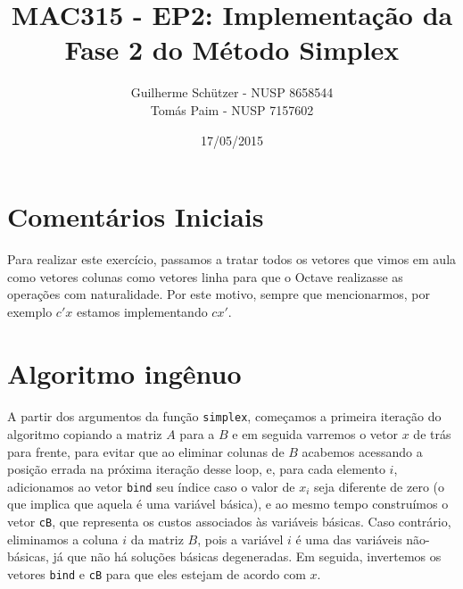 \documentclass[a4paper]{article}
\title{MAC315 - EP2: Implementação da Fase 2 do Método Simplex}
\author{
	Guilherme Schützer - NUSP 8658544 \\
	Tomás Paim         - NUSP 7157602
}
\date{17/05/2015}
\begin{document}
\maketitle

\section{Comentários Iniciais}

Para realizar este exercício, passamos a tratar todos os vetores que vimos em aula como vetores colunas como vetores linha para que o Octave realizasse as operações com naturalidade. Por este motivo, sempre que mencionarmos, por exemplo $c'x$ estamos implementando $cx'$.

\section{Algoritmo ingênuo}

\paragraph{}
A partir dos argumentos da função \texttt{simplex}, começamos a primeira iteração do algoritmo copiando a matriz $A$ para a $B$ e em seguida varremos o vetor $x$ de trás para frente, para evitar que ao eliminar colunas de $B$ acabemos acessando a posição errada na próxima iteração desse loop, e, para cada elemento $i$, adicionamos ao vetor \texttt{bind} seu índice caso o valor de $x_{i}$ seja diferente de zero (o que implica que aquela é uma variável básica), e ao mesmo tempo construímos o vetor \texttt{cB}, que representa os custos associados às variáveis básicas. Caso contrário, eliminamos a coluna $i$ da matriz $B$, pois a variável $i$ é uma das variáveis não-básicas, já que não há soluções básicas degeneradas. Em seguida, invertemos os vetores \texttt{bind} e \texttt{cB} para que eles estejam de acordo com $x$. 
\end{document}
